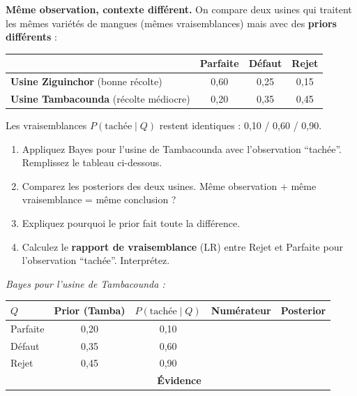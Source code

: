 \documentclass[11pt,a4paper]{article}
\begin{document}
\begin{exercicebox}[Énoncé]
\textbf{Même observation, contexte différent.} On compare deux usines qui traitent les mêmes variétés de mangues (mêmes vraisemblances) mais avec des \textbf{priors différents} :

\begin{center}
\begin{tabular}{lccc}
\toprule
& \textbf{Parfaite} & \textbf{Défaut} & \textbf{Rejet} \\
\midrule
\textbf{Usine Ziguinchor} (bonne récolte) & 0,60 & 0,25 & 0,15 \\
\textbf{Usine Tambacounda} (récolte médiocre) & 0,20 & 0,35 & 0,45 \\
\bottomrule
\end{tabular}
\end{center}

Les vraisemblances $P(\text{tachée} \mid Q)$ restent identiques : 0,10 / 0,60 / 0,90.

\begin{enumerate}
    \item Appliquez Bayes pour l'usine de Tambacounda avec l'observation ``tachée''. Remplissez le tableau ci-dessous.
    \item Comparez les posteriors des deux usines. Même observation + même vraisemblance = même conclusion ?
    \item Expliquez pourquoi le prior fait toute la différence.
    \item Calculez le \textbf{rapport de vraisemblance} (LR) entre Rejet et Parfaite pour l'observation ``tachée''. Interprétez.
\end{enumerate}
\end{exercicebox}

\noindent\textit{Bayes pour l'usine de Tambacounda :}

\begin{center}
\renewcommand{\arraystretch}{2.2}
\begin{tabular}{|l|c|c|c|c|}
\hline
$Q$ & \textbf{Prior} (Tamba) & $P(\text{tachée} \mid Q)$ & \textbf{Numérateur} & \textbf{Posterior} \\
\hline
Parfaite & 0,20 & 0,10 & \hspace{1.8cm} & \hspace{1.8cm} \\
\hline
Défaut & 0,35 & 0,60 & & \\
\hline
Rejet & 0,45 & 0,90 & & \\
\hline
\multicolumn{3}{|r|}{\textbf{Évidence}} & & \\
\hline
\end{tabular}
\end{center}
\end{document}
